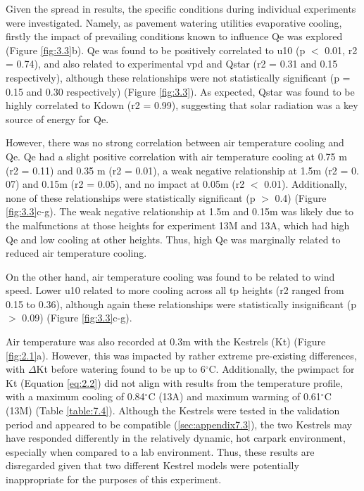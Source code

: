 \documentclass[final,3p,times,authoryear]{elsarticle}
\begin{document}
Given the spread in results, the specific conditions during individual experiments were investigated. Namely, as pavement watering utilities evaporative cooling, firstly the impact of prevailing conditions known to influence \gls{Qe} was explored (Figure \ref{fig:3.3}b). \gls{Qe} was found to be positively correlated to \gls{u10} (\gls{p} $<$ 0.01, \gls{r2} = 0.74), and also related to experimental \gls{vpd} and \gls{Qstar} (\gls{r2} = 0.31 and 0.15 respectively), although these relationships were not statistically significant (\gls{p} = 0.15 and 0.30 respectively) (Figure \ref{fig:3.3}). As expected, \gls{Qstar} was found to be highly correlated to \gls{Kdown} (\gls{r2} = 0.99), suggesting that solar radiation was a key source of energy for \gls{Qe}.

However, there was no strong correlation between air temperature cooling and \gls{Qe}. \gls{Qe} had a slight positive correlation with air temperature cooling at 0.75 m (\gls{r2} = 0.11) and 0.35 m (\gls{r2} = 0.01), a weak negative relationship at 1.5m (\gls{r2} = 0. 07) and 0.15m (\gls{r2} = 0.05), and no impact at 0.05m (\gls{r2} $<$ 0.01). Additionally, none of these relationships were statistically significant (\gls{p} $>$ 0.4) (Figure \ref{fig:3.3}c-g). The weak negative relationship at 1.5m and 0.15m was likely due to the malfunctions at those heights for experiment 13M and 13A, which had high \gls{Qe} and low cooling at other heights. Thus, high \gls{Qe} was marginally related to reduced air temperature cooling.

On the other hand, air temperature cooling was found to be related to wind speed. Lower \gls{u10} related to more cooling across all \gls{tp} heights (\gls{r2} ranged from 0.15 to 0.36), although again these relationships were statistically insignificant (\gls{p} $>$ 0.09) (Figure \ref{fig:3.3}c-g).

Air temperature was also recorded at 0.3m with the Kestrels (\gls{Kt}) (Figure \ref{fig:2.1}a). However, this was impacted by rather extreme pre-existing differences, with $\Delta$\gls{Kt} before watering found to be up to 6$^{\circ}$C. Additionally, the \gls{pwimpact} for \gls{Kt} (Equation \ref{eq:2.2}) did not align with results from the temperature profile, with a maximum cooling of 0.84$^{\circ}$C (13A) and maximum warming of 0.61$^{\circ}$C (13M) (Table \ref{table:7.4}). Although the Kestrels were tested in the validation period and appeared to be compatible (\ref{sec:appendix7.3}), the two Kestrels may have responded differently in the relatively dynamic, hot carpark environment, especially when compared to a lab environment. Thus, these results are disregarded given that two different Kestrel models were potentially inappropriate for the purposes of this experiment.
\end{document}
